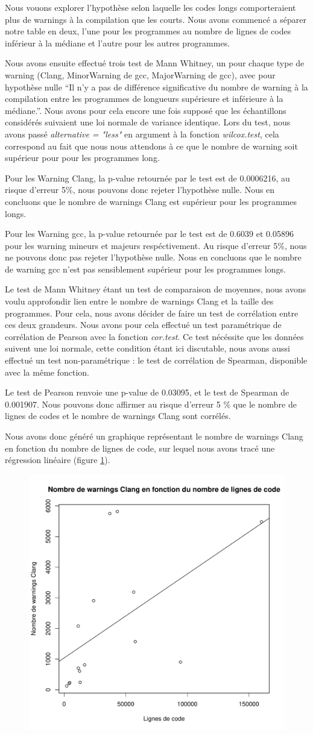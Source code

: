 Nous vouons explorer l'hypothèse selon laquelle les codes longs
comporteraient plus de warnings à la compilation que les courts. Nous
avons commencé a séparer notre table en deux, l'une pour les
programmes au nombre de lignes de codes inférieur à la médiane et
l'autre pour les autres programmes. 

Nous avons ensuite effectué trois test de Mann Whitney, un pour chaque
type de warning (Clang, MinorWarning de gcc, MajorWarning de gcc),
avec pour hypothèse nulle ``Il n'y a pas de différence significative
du nombre de warning à la compilation entre les programmes de
longueurs supérieure et inférieure à la médiane.''. Nous avons pour
cela encore une fois supposé que les échantillons considérés suivaient
une loi normale de variance identique. Lors du test, nous avons passé
\emph{alternative = "less"} en argument à la fonction
\emph{wilcox.test}, cela correspond au fait que nous nous attendons à
ce que le nombre de warning soit supérieur pour pour les programmes
long.

Pour les Warning Clang, la p-value retournée par le test est de
0.0006216, au risque d'erreur 5\%, nous pouvons donc rejeter
l'hypothèse nulle. Nous en concluons que le nombre de warnings Clang
est supérieur pour les programmes longs.

Pour les Warning gcc, la p-value retournée par le test est de 0.6039
et 0.05896 pour les warning mineurs et majeurs respéctivement. Au
risque d'erreur 5\%, nous ne pouvons donc pas rejeter l'hypothèse nulle. Nous
en concluons que le nombre de warning gcc n'est pas sensiblement supérieur pour les
programmes longs.

Le test de Mann Whitney étant un test de comparaison de moyennes, nous
avons voulu approfondir lien entre le nombre de warnings Clang et la
taille des programmes. Pour cela, nous avons décider de faire un test de
corrélation entre ces deux grandeurs. Nous avons pour cela effectué un
test paramétrique de corrélation de Pearson avec la fonction
\emph{cor.test}. Ce test nécéssite que les données suivent une loi
normale, cette condition étant ici discutable, nous avons aussi
effectué un test non-paramétrique : le test de
corrélation de Spearman, disponible avec la même fonction. 

Le test de Pearson renvoie une p-value de 0.03095, et le test de
Spearman de 0.001907. Nous pouvons donc affirmer au risque d'erreur 5 \%
que le nombre de lignes de codes et le nombre de warnings Clang sont
corrélés.

Nous avons donc généré un graphique représentant le nombre de warnings
Clang en fonction du nombre de lignes de code, sur lequel nous avons
tracé une régression linéaire (figure \ref{fig:clang_lin}).


\begin{figure}[h]
  \centering
  \includegraphics[width=.48\textwidth]{figures/clang_lin.pdf}
  \caption{}\label{fig:clang_lin}
\end{figure}